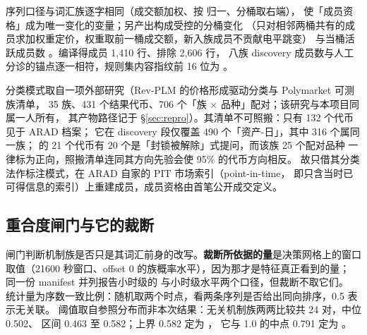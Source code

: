 \documentclass[11pt]{ctexart}
\begin{document}
序列口径与词汇族逐字相同（成交额加权、按  归一、分桶取右端），
使「成员资格」成为唯一变化的变量；另产出构成受控的分桶变化 
（只对相邻两桶共有的成员求加权重定价，权重取前一桶成交额，新入族成员不贡献电平跳变）
与当桶活跃成员数 。编译得成员 1{,}410 行、排除 2{,}606 行，
八族 discovery 成员数与人工分诊的锚点逐一相符，规则集内容指纹前 16 位为
。

分类模式取自一项外部研究（Rev-PLM 的价格形成驱动分类与 Polymarket 可测族清单，
35 族、431 个结果代币、706 个「族 $\times$ 品种」配对；该研究与本项目同属一人所有，
其产物路径记于 \S\ref{sec:repro}）。其清单不可照搬：只有 132 个代币见于 ARAD 档案；
它在 discovery 段仅覆盖 490 个「资产-日」，其中 316 个属同一族；
 的 21 个代币有 20 个是「封锁被解除」式提问，而该族 25 个配对品种
一律标为正向，照搬清单连同其方向先验会使 95\% 的代币方向相反。
故只借其分类法作标注模式，在 ARAD 自家的 PIT 市场索引（point-in-time，
即只含当时已可得信息的索引）上重建成员，成员资格由首笔公开成交定义。

\subsection{重合度闸门与它的裁断}
闸门判断机制族是否只是其词汇前身的改写。\textbf{裁断所依据的量}是决策网格上的窗口
取值（21600 秒窗口、offset 0 的族概率水平），因为那才是特征真正看到的量；
同一份 manifest 并列报告小时级的  与小时级水平两个口径，但裁断不取它们。
统计量为序数一致比例：随机取两个时点，看两条序列是否给出同向排序，0.5 表示无关联。
阈值取自参照分布而非本次结果：无关机制族两两比较共 24 对，中位 0.502、
区间 0.463 至 0.582；上界 0.582 定为 ，
它与 1.0 的中点 0.791 定为 。
\end{document}
